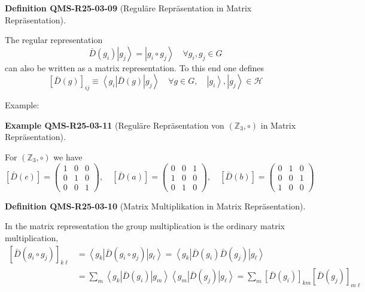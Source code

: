 \documentclass[10pt, letterpaper]{article}
\newcommand{\Z}{\mathbb{Z}}
\newcommand{\CustomHeading}[3]{%
  \par\medskip\noindent%
  \textbf{#1 #2} \textnormal{(#3)}.\enskip%
}
\newenvironment{DEF}[2]{\begin{unitbox}\CustomHeading{Definition}{#1}{#2}}{\end{unitbox}}
\newenvironment{EXA}[2]{\begin{unitbox}\CustomHeading{Example}{#1}{#2}}{\end{unitbox}}
\begin{document}
\begin{DEF}{QMS-R25-03-09}{Reguläre Repräsentation in Matrix Repräsentation}
The regular representation
$$
\bar{D}\left(g_{i}\right)\left|g_{j}\right\rangle=\left|g_{i} \circ g_{j}\right\rangle \quad \forall g_{i}, g_{j} \in G
$$
can also be written as a matrix representation. To this end one defines
$$
[\bar{D}(g)]_{i j} \equiv\left\langle g_{i}\right| \bar{D}(g)\left|g_{j}\right\rangle \quad \forall g \in G, \quad\left|g_{i}\right\rangle,\left|g_{j}\right\rangle \in \mathcal{H}
$$
\end{DEF}


Example: 


\begin{EXA}{QMS-R25-03-11}{Reguläre Repräsentation von $(\Z_{3},\circ )$ in Matrix Repräsentation}
For $(\Z_{3},\circ )$ we have
$$
[\bar{D}(e)]=\left(\begin{array}{ccc}
1 & 0 & 0 \\
0 & 1 & 0 \\
0 & 0 & 1
\end{array}\right), \quad[\bar{D}(a)]=\left(\begin{array}{ccc}
0 & 0 & 1 \\
1 & 0 & 0 \\
0 & 1 & 0
\end{array}\right), \quad[\bar{D}(b)]=\left(\begin{array}{ccc}
0 & 1 & 0 \\
0 & 0 & 1 \\
1 & 0 & 0
\end{array}\right)
$$
\end{EXA}


\begin{DEF}{QMS-R25-03-10}{Matrix Multiplikation in Matrix Repräsentation}
In the matrix representation the group multiplication is the ordinary matrix multiplication,
$$
\begin{aligned}
{\left[\bar{D}\left(g_{i} \circ g_{j}\right)\right]_{k \ell} } & =\left\langle g_{k}\right| \bar{D}\left(g_{i} \circ g_{j}\right)\left|g_{\ell}\right\rangle=\left\langle g_{k}\right| \bar{D}\left(g_{i}\right) \bar{D}\left(g_{j}\right)\left|g_{\ell}\right\rangle \\
& =\sum_{m}\left\langle g_{k}\right| \bar{D}\left(g_{i}\right)\left|g_{m}\right\rangle\left\langle g_{m}\right| \bar{D}\left(g_{j}\right)\left|g_{\ell}\right\rangle=\sum_{m}\left[\bar{D}\left(g_{i}\right)\right]_{k m}\left[\bar{D}\left(g_{j}\right)\right]_{m \ell}
\end{aligned}
$$
\end{DEF}
\end{document}
